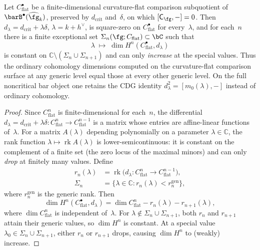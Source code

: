 \begin{theorem}
\label{thm:bar-cohomology-level-independence}
Let $C^\bullet_{\mathrm{flat}}$ be a finite-dimensional
curvature-flat comparison subquotient of
\(\barB^\bullet(\widehat{\fg}_k)\), preserved by
$d_{\mathrm{crit}}$ and~$\delta$, on which
$[\mathsf C_{\fg},-]=0$.  Then
$d_\lambda=d_{\mathrm{crit}}+\lambda\delta$,
$\lambda=k+h^\vee$, is square-zero on
$C^\bullet_{\mathrm{flat}}$ for every~$\lambda$, and for each~$n$
there is a finite exceptional set
$\Sigma_n(\fg;C_{\mathrm{flat}})\subset\bC$ such that
\[
\lambda \;\mapsto\;
\dim H^n(C^\bullet_{\mathrm{flat}},d_\lambda)
\]
is constant on $\mathbb{C} \setminus
(\Sigma_n \cup \Sigma_{n+1})$ and can only
\emph{increase} at the special values.
Thus the ordinary cohomology dimensions computed on the
curvature-flat comparison surface at any generic level equal those
at every other generic level.  On the full noncritical bar object
one retains the CDG identity \(d_\lambda^2=[m_0(\lambda),-]\)
instead of ordinary cohomology.
\end{theorem}

\begin{proof}
Since $C^n_{\mathrm{flat}}$ is finite-dimensional for each~$n$,
the differential $d_\lambda = d_{\mathrm{crit}} + \lambda\delta
\colon C^n_{\mathrm{flat}} \to C^{n-1}_{\mathrm{flat}}$
is a matrix whose entries are affine-linear functions of~$\lambda$.
For a matrix $A(\lambda)$ depending polynomially on a
parameter $\lambda \in \mathbb{C}$, the rank function
$\lambda \mapsto \operatorname{rk} A(\lambda)$ is
lower-semicontinuous: it is constant on the complement
of a finite set (the zero locus of the maximal minors)
and can only \emph{drop} at finitely many values.
Define
\begin{align*}
r_n(\lambda) &= \operatorname{rk}\bigl(d_\lambda
 \colon C^n_{\mathrm{flat}} \to C^{n-1}_{\mathrm{flat}}\bigr), \\
\Sigma_n &= \{\lambda \in \mathbb{C} :
 r_n(\lambda) < r_n^{\mathrm{gen}}\},
\end{align*}
where $r_n^{\mathrm{gen}}$ is the generic rank. Then
\[
\dim H^n(C^\bullet_{\mathrm{flat}}, d_\lambda)
= \dim C^n_{\mathrm{flat}} - r_n(\lambda) - r_{n+1}(\lambda),
\]
where $\dim C^n_{\mathrm{flat}}$ is independent of~$\lambda$.
For
$\lambda \notin \Sigma_n \cup \Sigma_{n+1}$,
both $r_n$ and $r_{n+1}$ attain their generic values,
so $\dim H^n$ is constant.
At a special value $\lambda_0 \in \Sigma_n \cup \Sigma_{n+1}$,
either $r_n$ or $r_{n+1}$ drops, causing $\dim H^n$
to (weakly) increase.
\end{proof}

